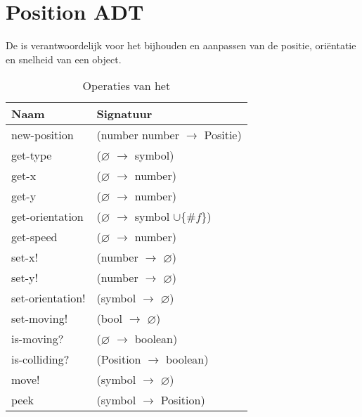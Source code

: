 \section{Position ADT}
\label{section:positie}

De \texttt{} is verantwoordelijk voor het bijhouden en aanpassen van de positie, oriëntatie en snelheid van een object.

\begin{table}[hbt]
\centering
\begin{tabular}{|ll|}
\hline
\rowcolor[HTML]{000000} 
{\color[HTML]{FFFFFF} \textbf{Naam}} & {\color[HTML]{FFFFFF} \textbf{Signatuur}} \\ \hline
new-position     & (number number $\rightarrow$ Positie)                       \\ \hline
get-type         & ($\varnothing$ $\rightarrow$ symbol)                        \\ \hline
get-x            & ($\varnothing$ $\rightarrow$ number)                        \\ \hline
get-y            & ($\varnothing$ $\rightarrow$ number)                        \\ \hline
get-orientation  & ($\varnothing$ $\rightarrow$ symbol $\cup\{\#f\}$)          \\ \hline
get-speed        & ($\varnothing$ $\rightarrow$ number)                        \\ \hline
set-x!           & (number $\rightarrow$ $\varnothing$)                        \\ \hline
set-y!           & (number $\rightarrow$ $\varnothing$)                        \\ \hline
set-orientation! & (symbol $\rightarrow$ $\varnothing$)                        \\ \hline
set-moving!      & (bool $\rightarrow$ $\varnothing$)                          \\ \hline
is-moving?       & ($\varnothing$ $\rightarrow$ boolean)                       \\ \hline
is-colliding?    & (Position $\rightarrow$ boolean)                            \\ \hline
move!            & (symbol $\rightarrow$ $\varnothing$)                        \\ \hline
peek             & (symbol $\rightarrow$ Position)                             \\ \hline
\end{tabular}
\caption{Operaties van het \texttt{}}
\label{table:positie}
\end{table}

